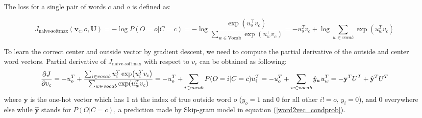 \documentclass{assignment format}
\begin{document}

The loss for a single pair of words $c$ and $o$ is defined as:


\begin{equation}
 J_{\text{naive-softmax}}(\bm v_c, o, \bm U)=-\log P(O=o|C=c)= -\log\frac{\exp(u_{o}^\top v_c)}{\sum_{w \in \text{Vocab}} \exp( u_{w}^\top v_c)}=-u_o^T v_c+\log\sum_{w\in vocab}\exp(u_w^Tv_c)
\label{loss}
\end{equation}


To learn the correct center and outside vector by gradient descent, we need to compute the partial derivative of the outside and center word vectors. Partial derivative of $J_{\text{naive-softmax}}$ with respect to $v_c$ can be obtained as following:
\begin{equation}
\frac{\partial J}{\partial v_c}= -u_o^T+\frac{\sum_{i\in vocab} u_i^T\exp(u_i^Tv_c)}{\sum_{w\in vocab}\exp(u_w^Tv_c)}\\
=-u_o^T+\sum_{i\in vocab}P(O=i|C=c)u_i^T\\= -u_o^T+\sum_{w \in vocab}\hat{y}_wu_w^T\\
= -\mathbf{y}^TU^T+\hat{\mathbf{y}}^TU^T
\label{partial v_c}
\end{equation}where $\mathbf{y}$ is the one-hot vector which has 1 at the index of true outside word $o$ ($y_o=1$ and 0 for all other $i!=o$, $y_i=0$), and 0 everywhere else while $\hat{\mathbf{y}}$ stands for $P(O|C=c)$, a prediction made by Skip-gram model in equation (\ref{word2vec_condprob}).
\end{document}
